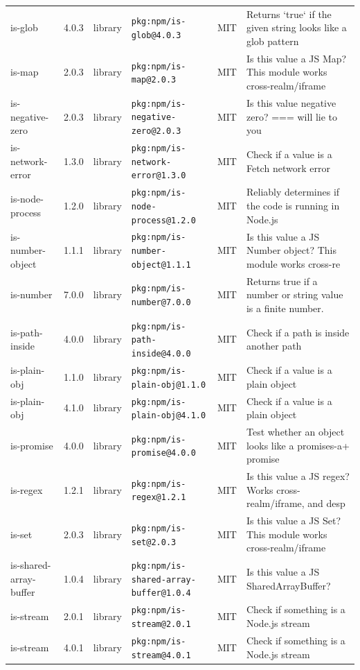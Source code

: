 \documentclass[11pt]{article}
\begin{document}
\begin{longtable}{|l|l|l|p{2.2cm}|l|p{4cm}|}
is-glob & 4.0.3 & library & \texttt{pkg:npm/is-glob@4.0.3} & MIT & Returns `true` if the given string looks like a glob pattern \\
is-map & 2.0.3 & library & \texttt{pkg:npm/is-map@2.0.3} & MIT & Is this value a JS Map? This module works cross-realm/iframe \\
is-negative-zero & 2.0.3 & library & \texttt{pkg:npm/is-negative-zero@2.0.3} & MIT & Is this value negative zero? === will lie to you \\
is-network-error & 1.3.0 & library & \texttt{pkg:npm/is-network-error@1.3.0} & MIT & Check if a value is a Fetch network error \\
is-node-process & 1.2.0 & library & \texttt{pkg:npm/is-node-process@1.2.0} & MIT & Reliably determines if the code is running in Node.js \\
is-number-object & 1.1.1 & library & \texttt{pkg:npm/is-number-object@1.1.1} & MIT & Is this value a JS Number object? This module works cross-re \\
is-number & 7.0.0 & library & \texttt{pkg:npm/is-number@7.0.0} & MIT & Returns true if a number or string value is a finite number. \\
is-path-inside & 4.0.0 & library & \texttt{pkg:npm/is-path-inside@4.0.0} & MIT & Check if a path is inside another path \\
is-plain-obj & 1.1.0 & library & \texttt{pkg:npm/is-plain-obj@1.1.0} & MIT & Check if a value is a plain object \\
is-plain-obj & 4.1.0 & library & \texttt{pkg:npm/is-plain-obj@4.1.0} & MIT & Check if a value is a plain object \\
is-promise & 4.0.0 & library & \texttt{pkg:npm/is-promise@4.0.0} & MIT & Test whether an object looks like a promises-a+ promise \\
is-regex & 1.2.1 & library & \texttt{pkg:npm/is-regex@1.2.1} & MIT & Is this value a JS regex? Works cross-realm/iframe, and desp \\
is-set & 2.0.3 & library & \texttt{pkg:npm/is-set@2.0.3} & MIT & Is this value a JS Set? This module works cross-realm/iframe \\
is-shared-array-buffer & 1.0.4 & library & \texttt{pkg:npm/is-shared-array-buffer@1.0.4} & MIT & Is this value a JS SharedArrayBuffer? \\
is-stream & 2.0.1 & library & \texttt{pkg:npm/is-stream@2.0.1} & MIT & Check if something is a Node.js stream \\
is-stream & 4.0.1 & library & \texttt{pkg:npm/is-stream@4.0.1} & MIT & Check if something is a Node.js stream \\

\end{longtable}
\end{document}
